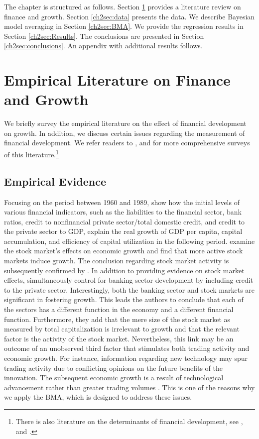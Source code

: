 \begin{refsection}
The chapter is structured as follows. Section \ref{ch2sec:litsurvey} provides a literature review on finance and growth. Section \ref{ch2sec:data} presents the data. We describe Bayesian model averaging in Section \ref{ch2sec:BMA}. We provide the regression results in Section \ref{ch2sec:Results}. The conclusions are presented in Section \ref{ch2sec:conclusions}. An appendix with additional results follows. 
%
%
% 
%
%
\section{Empirical Literature on Finance and Growth}
\label{ch2sec:litsurvey}

We briefly survey the empirical literature on the effect of financial development on growth. In addition, we discuss certain issues regarding the measurement of financial development. We refer readers to \textcite{Levine2005}, \textcite{Ang2008} and \textcite{Valickovaetal2014} for more comprehensive surveys of this literature.\footnote{There is also literature on the determinants of financial development, see \textcite{Ang2013}, and \textcite{angkumar}.}

\subsection{Empirical Evidence}

Focusing on the period between 1960 and 1989, \textcite{KingLevine1993a} show how the initial levels of various financial indicators, such as the liabilities to the financial sector, bank ratios, credit to nonfinancial private sector/total domestic credit, and credit to the private sector to GDP, explain the real growth of GDP per capita, capital accumulation, and efficiency of capital utilization in the following period. \textcite{AtjeJovanovich1993} examine the stock market's effects on economic growth and find that more active stock markets induce growth. The conclusion regarding stock market activity is subsequently confirmed by \textcite{LevineZervos1998}. In addition to providing evidence on stock market effects, \textcite{LevineZervos1998} simultaneously control for banking sector development by including credit to the private sector. Interestingly, both the banking sector and stock markets are significant in fostering growth. This leads the authors to conclude that each of the sectors has a different function in the economy and a different financial function. Furthermore, they add that the mere size of the stock market as measured by total capitalization is irrelevant to growth and that the relevant factor is the activity of the stock market. Nevertheless, this link may be an outcome of an unobserved third factor that stimulates both trading activity and economic growth. For instance, information regarding new technology may spur trading activity due to conflicting opinions on the future benefits of the innovation. The subsequent economic growth is a result of technological advancement rather than greater trading volumes \parencite{Levine2005}. This is one of the reasons why we apply the \ac{BMA}, which is designed to address these issues.


\end{refsection}

